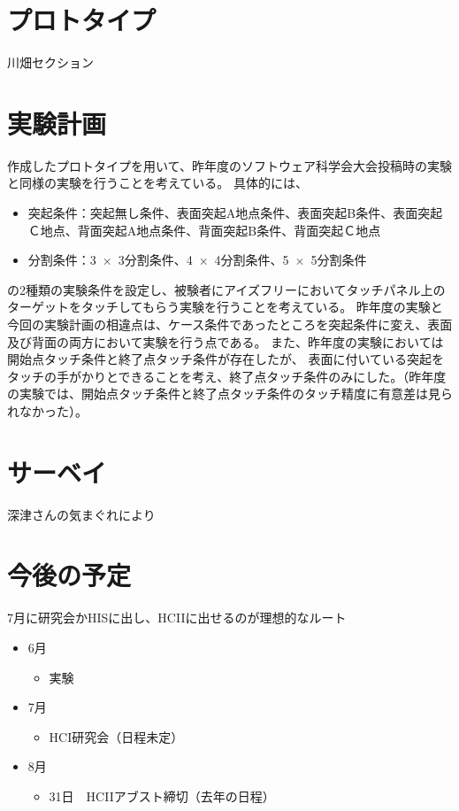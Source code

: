 \documentclass[11pt,a4paper]{jarticle}
\begin{document}
\section{プロトタイプ}
川畑セクション

\section{実験計画}
作成したプロトタイプを用いて、昨年度のソフトウェア科学会大会投稿時の実験と同様の実験を行うことを考えている。
具体的には、
\begin{itemize}
	\item 突起条件：突起無し条件、表面突起A地点条件、表面突起B条件、表面突起Ｃ地点、背面突起A地点条件、背面突起B条件、背面突起Ｃ地点
	\item 分割条件：3~$\times$~3分割条件、4~$\times$~4分割条件、5~$\times$~5分割条件
\end{itemize}
の2種類の実験条件を設定し、被験者にアイズフリーにおいてタッチパネル上のターゲットをタッチしてもらう実験を行うことを考えている。
昨年度の実験と今回の実験計画の相違点は、ケース条件であったところを突起条件に変え、表面及び背面の両方において実験を行う点である。
また、昨年度の実験においては開始点タッチ条件と終了点タッチ条件が存在したが、
表面に付いている突起をタッチの手がかりとできることを考え、終了点タッチ条件のみにした。（昨年度の実験では、開始点タッチ条件と終了点タッチ条件のタッチ精度に有意差は見られなかった）。

\section{サーベイ}
深津さんの気まぐれにより

\section{今後の予定}
7月に研究会かHISに出し、HCIIに出せるのが理想的なルート
\begin{itemize}
  \item 6月
  \begin{itemize}
    \item 実験
  \end{itemize}
  \item 7月
  \begin{itemize}
    \item HCI研究会（日程未定）
  \end{itemize}
  \item 8月
  \begin{itemize}
    \item 31日　HCIIアブスト締切（去年の日程）
  \end{itemize}
\end{itemize}


\end{document}
